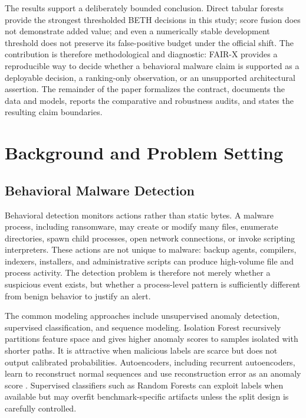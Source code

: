 \documentclass[10pt,journal,compsoc]{IEEEtran}
\begin{document}
The results support a deliberately bounded conclusion. Direct tabular forests provide the strongest thresholded BETH decisions in this study; score fusion does not demonstrate added value; and even a numerically stable development threshold does not preserve its false-positive budget under the official shift. The contribution is therefore methodological and diagnostic: FAIR-X provides a reproducible way to decide whether a behavioral malware claim is supported as a deployable decision, a ranking-only observation, or an unsupported architectural assertion. The remainder of the paper formalizes the contract, documents the data and models, reports the comparative and robustness audits, and states the resulting claim boundaries.

\section{Background and Problem Setting}
\label{sec:background}

\subsection{Behavioral Malware Detection}

Behavioral detection monitors actions rather than static bytes. A malware process, including ransomware, may create or modify many files, enumerate directories, spawn child processes, open network connections, or invoke scripting interpreters. These actions are not unique to malware: backup agents, compilers, indexers, installers, and administrative scripts can produce high-volume file and process activity. The detection problem is therefore not merely whether a suspicious event exists, but whether a process-level pattern is sufficiently different from benign behavior to justify an alert.

The common modeling approaches include unsupervised anomaly detection, supervised classification, and sequence modeling. Isolation Forest \cite{liu2008} recursively partitions feature space and gives higher anomaly scores to samples isolated with shorter paths. It is attractive when malicious labels are scarce but does not output calibrated probabilities. Autoencoders, including recurrent autoencoders, learn to reconstruct normal sequences and use reconstruction error as an anomaly score \cite{cho2014,du2017}. Supervised classifiers such as Random Forests \cite{breiman2001} can exploit labels when available but may overfit benchmark-specific artifacts unless the split design is carefully controlled.
\end{document}
